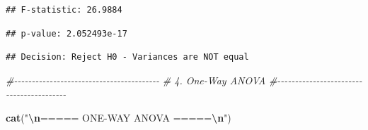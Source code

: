 \documentclass[
  12pt,
]{article}
\newenvironment{Shaded}{\begin{snugshade}}{\end{snugshade}}
\newcommand{\AttributeTok}[1]{\textcolor[rgb]{0.13,0.29,0.53}{#1}}
\newcommand{\CommentTok}[1]{\textcolor[rgb]{0.56,0.35,0.01}{\textit{#1}}}
\newcommand{\ConstantTok}[1]{\textcolor[rgb]{0.56,0.35,0.01}{#1}}
\newcommand{\DecValTok}[1]{\textcolor[rgb]{0.00,0.00,0.81}{#1}}
\newcommand{\FunctionTok}[1]{\textcolor[rgb]{0.13,0.29,0.53}{\textbf{#1}}}
\newcommand{\NormalTok}[1]{#1}
\newcommand{\SpecialCharTok}[1]{\textcolor[rgb]{0.81,0.36,0.00}{\textbf{#1}}}
\newcommand{\StringTok}[1]{\textcolor[rgb]{0.31,0.60,0.02}{#1}}
\begin{document}
\begin{verbatim}
## F-statistic: 26.9884
\end{verbatim}

\begin{Shaded}
\end{Shaded}

\begin{verbatim}
## p-value: 2.052493e-17
\end{verbatim}

\begin{Shaded}
\end{Shaded}

\begin{verbatim}
## Decision: Reject H0 - Variances are NOT equal
\end{verbatim}

\begin{Shaded}
\begin{Highlighting}[]
\CommentTok{\#{-}{-}{-}{-}{-}{-}{-}{-}{-}{-}{-}{-}{-}{-}{-}{-}{-}{-}{-}{-}{-}{-}{-}{-}{-}{-}{-}{-}{-}{-}{-}{-}{-}{-}{-}{-}{-}{-}{-}{-}{-}}
\CommentTok{\# 4. One{-}Way ANOVA}
\CommentTok{\#{-}{-}{-}{-}{-}{-}{-}{-}{-}{-}{-}{-}{-}{-}{-}{-}{-}{-}{-}{-}{-}{-}{-}{-}{-}{-}{-}{-}{-}{-}{-}{-}{-}{-}{-}{-}{-}{-}{-}{-}{-}}

\FunctionTok{cat}\NormalTok{(}\StringTok{"}\SpecialCharTok{\textbackslash{}n}\StringTok{===== ONE{-}WAY ANOVA =====}\SpecialCharTok{\textbackslash{}n}\StringTok{"}\NormalTok{)}
\end{Highlighting}
\end{Shaded}
\end{document}
